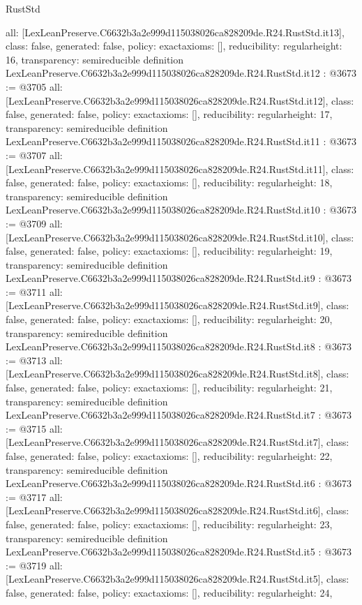 \begin{lexlean}{RustStd}
\begin{coremodule}
{  all: [LexLeanPreserve.C6632b3a2e999d115038026ca828209de.R24.RustStd.it13],
  class: false,
  generated: false,
  policy: exact{axioms: []},
  reducibility: regular{height: 16},
  transparency: semireducible
}
definition LexLeanPreserve.C6632b3a2e999d115038026ca828209de.R24.RustStd.it12 : @3673 := @3705 {
  all: [LexLeanPreserve.C6632b3a2e999d115038026ca828209de.R24.RustStd.it12],
  class: false,
  generated: false,
  policy: exact{axioms: []},
  reducibility: regular{height: 17},
  transparency: semireducible
}
definition LexLeanPreserve.C6632b3a2e999d115038026ca828209de.R24.RustStd.it11 : @3673 := @3707 {
  all: [LexLeanPreserve.C6632b3a2e999d115038026ca828209de.R24.RustStd.it11],
  class: false,
  generated: false,
  policy: exact{axioms: []},
  reducibility: regular{height: 18},
  transparency: semireducible
}
definition LexLeanPreserve.C6632b3a2e999d115038026ca828209de.R24.RustStd.it10 : @3673 := @3709 {
  all: [LexLeanPreserve.C6632b3a2e999d115038026ca828209de.R24.RustStd.it10],
  class: false,
  generated: false,
  policy: exact{axioms: []},
  reducibility: regular{height: 19},
  transparency: semireducible
}
definition LexLeanPreserve.C6632b3a2e999d115038026ca828209de.R24.RustStd.it9 : @3673 := @3711 {
  all: [LexLeanPreserve.C6632b3a2e999d115038026ca828209de.R24.RustStd.it9],
  class: false,
  generated: false,
  policy: exact{axioms: []},
  reducibility: regular{height: 20},
  transparency: semireducible
}
definition LexLeanPreserve.C6632b3a2e999d115038026ca828209de.R24.RustStd.it8 : @3673 := @3713 {
  all: [LexLeanPreserve.C6632b3a2e999d115038026ca828209de.R24.RustStd.it8],
  class: false,
  generated: false,
  policy: exact{axioms: []},
  reducibility: regular{height: 21},
  transparency: semireducible
}
definition LexLeanPreserve.C6632b3a2e999d115038026ca828209de.R24.RustStd.it7 : @3673 := @3715 {
  all: [LexLeanPreserve.C6632b3a2e999d115038026ca828209de.R24.RustStd.it7],
  class: false,
  generated: false,
  policy: exact{axioms: []},
  reducibility: regular{height: 22},
  transparency: semireducible
}
definition LexLeanPreserve.C6632b3a2e999d115038026ca828209de.R24.RustStd.it6 : @3673 := @3717 {
  all: [LexLeanPreserve.C6632b3a2e999d115038026ca828209de.R24.RustStd.it6],
  class: false,
  generated: false,
  policy: exact{axioms: []},
  reducibility: regular{height: 23},
  transparency: semireducible
}
definition LexLeanPreserve.C6632b3a2e999d115038026ca828209de.R24.RustStd.it5 : @3673 := @3719 {
  all: [LexLeanPreserve.C6632b3a2e999d115038026ca828209de.R24.RustStd.it5],
  class: false,
  generated: false,
  policy: exact{axioms: []},
  reducibility: regular{height: 24},
}
\end{coremodule}
\end{lexlean}
